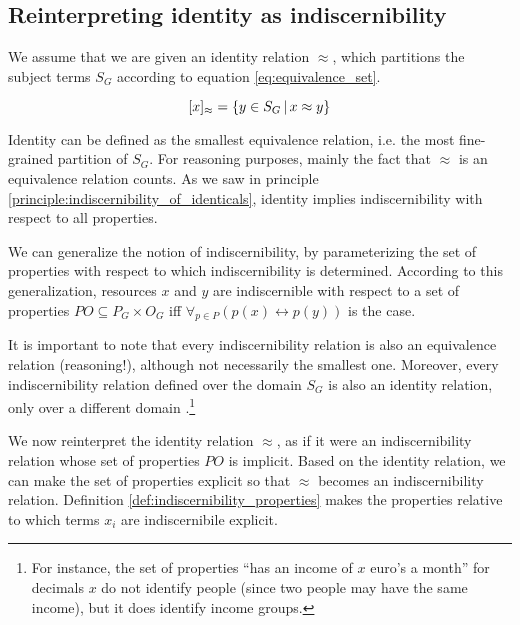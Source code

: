 \subsection{Reinterpreting identity as indiscernibility}

We assume that we are given an identity relation $\approx$,
  which partitions the subject terms $S_G$ according to
  equation \ref{eq:equivalence_set}.

\begin{equation}
\label{eq:equivalence_set}
  [x]_{\approx}
=
  \{
    y \in S_G
  \,\vert\,
    x \approx y
  \}
\end{equation}

Identity can be defined as the smallest equivalence relation,
  i.e. the most fine-grained partition of $S_G$.
For reasoning purposes, mainly the fact that $\approx$
  is an equivalence relation counts.
As we saw in principle \ref{principle:indiscernibility_of_identicals},
  identity implies indiscernibility with respect to all properties.

We can generalize the notion of indiscernibility,
  by parameterizing the set of properties with respect to which
  indiscernibility is determined.
According to this generalization,
  resources $x$ and $y$ are indiscernible with respect to
  a set of properties $PO \subseteq P_G \times O_G$
  iff $\forall_{p \in P}(p(x) \leftrightarrow p(y))$ is the case.

It is important to note that every indiscernibility relation
  is also an equivalence relation (reasoning!),
  although not necessarily the smallest one.
Moreover, every indiscernibility relation defined over the domain $S_G$
  is also an identity relation,
  only over a different domain \cite{Quine1950}.\footnote{
    For instance, the set of properties
      ``has an income of $x$ euro's a month''
      for decimals $x$ do not identify people
      (since two people may have the same income),
      but it does identify income groups.
    }

We now reinterpret the identity relation $\approx$,
  as if it were an indiscernibility relation
  whose set of properties $PO$ is implicit.
Based on the identity relation,
  we can make the set of properties explicit
  so that $\approx$ becomes an indiscernibility relation.
Definition \ref{def:indiscernibility_properties} makes
  the properties relative to which terms $x_i$ are indiscernibile
  explicit.

